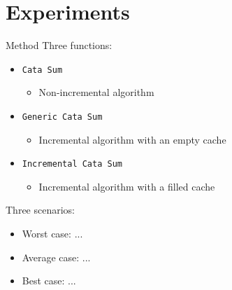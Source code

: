\section{Experiments}

\begin{slide}{Method}
Three functions:
\begin{itemize}
  \item \texttt{Cata Sum} 
  \begin{itemize}
    \item Non-incremental algorithm
  \end{itemize}
  \item \texttt{Generic Cata Sum}
  \begin{itemize}
    \item Incremental algorithm with an empty cache
  \end{itemize}
  \item \texttt{Incremental Cata Sum}
  \begin{itemize}
    \item Incremental algorithm with a filled cache
  \end{itemize}
\end{itemize}

Three scenarios:
\begin{itemize}
  \item Worst case: ...
  \item Average case: ...
  \item Best case: ...
\end{itemize}

\end{slide}

